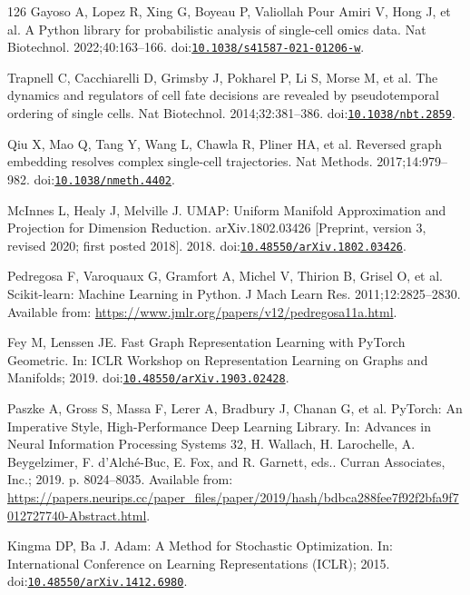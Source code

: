 \begin{thebibliography}{126}
Gayoso A, Lopez R, Xing G, Boyeau P, Valiollah Pour Amiri V, Hong J, et al. A Python library for probabilistic analysis of single-cell omics data. Nat Biotechnol. 2022;40:163--166. doi:\href{https://doi.org/10.1038/s41587-021-01206-w}{\nolinkurl{10.1038/s41587-021-01206-w}}.

Trapnell C, Cacchiarelli D, Grimsby J, Pokharel P, Li S, Morse M, et al. The dynamics and regulators of cell fate decisions are revealed by pseudotemporal ordering of single cells. Nat Biotechnol. 2014;32:381--386. doi:\href{https://doi.org/10.1038/nbt.2859}{\nolinkurl{10.1038/nbt.2859}}.

Qiu X, Mao Q, Tang Y, Wang L, Chawla R, Pliner HA, et al. Reversed graph embedding resolves complex single-cell trajectories. Nat Methods. 2017;14:979--982. doi:\href{https://doi.org/10.1038/nmeth.4402}{\nolinkurl{10.1038/nmeth.4402}}.

McInnes L, Healy J, Melville J. UMAP: Uniform Manifold Approximation and Projection for Dimension Reduction. arXiv.1802.03426 [Preprint, version 3, revised 2020; first posted 2018]. 2018. doi:\href{https://doi.org/10.48550/arXiv.1802.03426}{\nolinkurl{10.48550/arXiv.1802.03426}}.

Pedregosa F, Varoquaux G, Gramfort A, Michel V, Thirion B, Grisel O, et al. Scikit-learn: Machine Learning in Python. J Mach Learn Res. 2011;12:2825--2830. Available from: \url{https://www.jmlr.org/papers/v12/pedregosa11a.html}.

Fey M, Lenssen JE. Fast Graph Representation Learning with PyTorch Geometric. In: ICLR Workshop on Representation Learning on Graphs and Manifolds; 2019. doi:\href{https://doi.org/10.48550/arXiv.1903.02428}{\nolinkurl{10.48550/arXiv.1903.02428}}.

Paszke A, Gross S, Massa F, Lerer A, Bradbury J, Chanan G, et al. PyTorch: An Imperative Style, High-Performance Deep Learning Library. In: Advances in Neural Information Processing Systems 32, H. Wallach, H. Larochelle, A. Beygelzimer, F. d'Alché-Buc, E. Fox, and R. Garnett, eds.. Curran Associates, Inc.; 2019. p. 8024--8035. Available from: \url{https://papers.neurips.cc/paper_files/paper/2019/hash/bdbca288fee7f92f2bfa9f7012727740-Abstract.html}.

Kingma DP, Ba J. Adam: A Method for Stochastic Optimization. In: International Conference on Learning Representations (ICLR); 2015. doi:\href{https://doi.org/10.48550/arXiv.1412.6980}{\nolinkurl{10.48550/arXiv.1412.6980}}.


\end{thebibliography}
